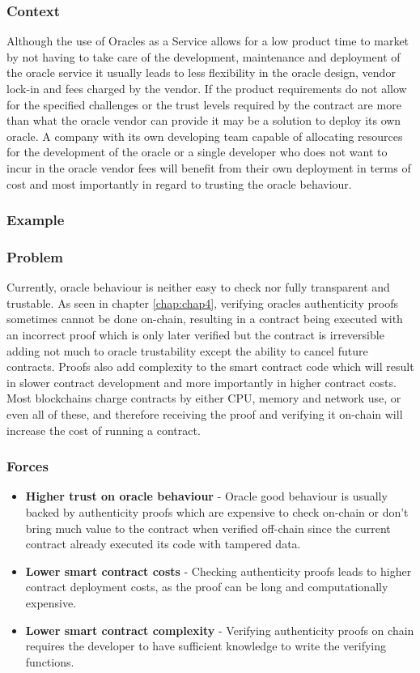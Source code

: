 \subsubsection{Context}
Although the use of Oracles as a Service allows for a low product time to market by not having to take care of the development, maintenance and deployment of the oracle service it usually leads to less flexibility in the oracle design, vendor lock-in and fees charged by the vendor. If the product requirements do not allow for the specified challenges or the trust levels required by the contract are more than what the oracle vendor can provide it may be a solution to deploy its own oracle. A company with its own developing team capable of allocating resources for the development of the oracle or a single developer who does not want to incur in the oracle vendor fees will benefit from their own deployment in terms of cost and most importantly in regard to trusting the oracle behaviour.

\subsubsection{Example}


\subsubsection{Problem}
Currently, oracle behaviour is neither easy to check nor fully transparent and trustable. As seen in chapter \ref{chap:chap4}, verifying oracles authenticity proofs sometimes cannot be done on-chain, resulting in a contract being executed with an incorrect proof which is only later verified but the contract is irreversible adding not much to oracle trustability except the ability to cancel future contracts. Proofs also add complexity to the smart contract code which will result in slower contract development and more importantly in higher contract costs. Most blockchains charge contracts by either CPU, memory and network use, or even all of these, and therefore receiving the proof and verifying it on-chain will increase the cost of running a contract.

\subsubsection{Forces}
\begin{itemize}
  \item \textbf{Higher trust on oracle behaviour} - Oracle good behaviour is usually backed by authenticity proofs which are expensive to check on-chain or don't bring much value to the contract when verified off-chain since the current contract already executed its code with tampered data.
  \item \textbf{Lower smart contract costs} - Checking authenticity proofs leads to higher contract deployment costs, as the proof can be long and computationally expensive.
  \item \textbf{Lower smart contract complexity} - Verifying authenticity proofs on chain requires the developer to have sufficient knowledge to write the verifying functions.
\end{itemize}

